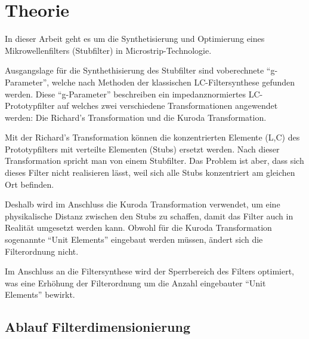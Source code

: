 \section{Theorie}


In  dieser  Arbeit  geht  es  um die  Synthetisierung  und  Optimierung  eines
Mikrowellenfilters (Stubfilter) in Microstrip-Technologie.

Ausgangslage  für  die  Synthethisierung  des  Stubfilter  sind   voberechnete
``g-Parameter'',  welche  nach  Methoden  der   klassischen  LC-Filtersynthese
gefunden  werden.  Diese  ``g-Parameter'' beschreiben  ein  impedanznormiertes
LC-Prototypfilter    auf    welches    zwei    verschiedene   Transformationen
angewendet werden: Die Richard's Transformation und die Kuroda Transformation.

Mit der Richard's Transformation können  die konzentrierten Elemente (L,C) des
Prototypfilters mit verteilte  Elementen  (Stubs)  ersetzt werden. Nach dieser
Transformation  spricht  man  von einem Stubfilter. Das Problem ist aber, dass
sich dieses Filter nicht realisieren lässt,  weil sich alle Stubs konzentriert
am gleichen Ort befinden.

Deshalb  wird  im Anschluss  die  Kuroda  Transformation  verwendet,  um  eine
physikalische Distanz zwischen den Stubs zu schaffen, damit das Filter auch in
Realit\"at  umgesetzt  werden  kann.  Obwohl  für  die  Kuroda  Transformation
sogenannte  ``Unit  Elements''  eingebaut  werden   müssen,  ändert  sich  die
Filterordnung nicht.

Im  Anschluss  an   die  Filtersynthese  wird  der  Sperrbereich  des  Filters
optimiert,  was  eine  Erhöhung  der Filterordnung um die  Anzahl  eingebauter
``Unit  Elements'' bewirkt.







\subsection{Ablauf Filterdimensionierung}


